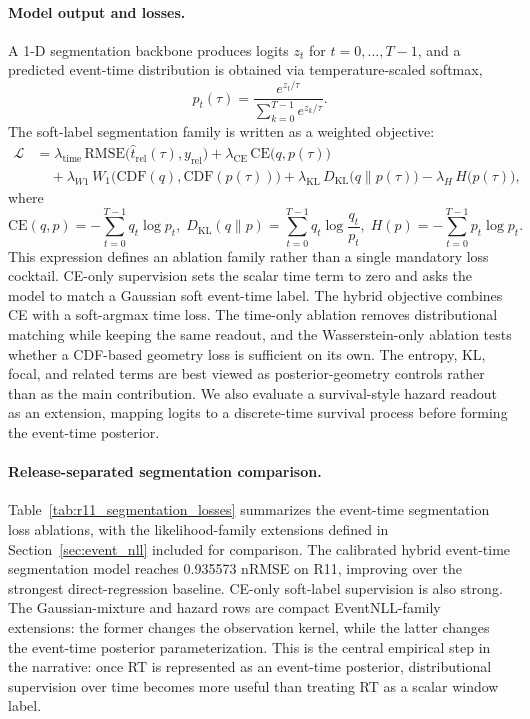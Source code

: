 \documentclass[12pt]{article}
\begin{document}
\paragraph{Model output and losses.}
A 1-D segmentation backbone produces logits $z_t$ for $t=0,\dots,T-1$, and a predicted
event-time distribution is obtained via temperature-scaled softmax,
\begin{equation}
\label{eq:rt_pred_dist}
p_t(\tau)=\frac{e^{z_t/\tau}}{\sum_{k=0}^{T-1} e^{z_k/\tau}}.
\end{equation}
The soft-label segmentation family is written as a weighted objective:
\begin{equation}
\label{eq:rt_loss}
\begin{aligned}
\mathcal{L}
&= \lambda_{\text{time}}\,\mathrm{RMSE}\big(\hat t_{\mathrm{rel}}(\tau), y_{\mathrm{rel}}\big)
 + \lambda_{\text{CE}}\,\mathrm{CE}\big(q, p(\tau)\big) \\
&\quad + \lambda_{W1}\,W_1\big(\mathrm{CDF}(q), \mathrm{CDF}(p(\tau))\big)
 + \lambda_{\text{KL}}\,D_{\mathrm{KL}}\big(q\|p(\tau)\big)
 - \lambda_{H}\,H\big(p(\tau)\big),
\end{aligned}
\end{equation}
where  
\begin{equation*}
\mathrm{CE}(q,p)=-\sum_{t=0}^{T-1} q_t \log p_t, \;
D_{\mathrm{KL}}(q\|p)=\sum_{t=0}^{T-1} q_t \log\frac{q_t}{p_t}, \;
H(p)=-\sum_{t=0}^{T-1} p_t \log p_t.
\end{equation*}
This expression defines an ablation family rather than a single mandatory loss cocktail. CE-only supervision sets the scalar time term to zero and asks the model to match a Gaussian soft event-time label. The hybrid objective combines CE with a soft-argmax time loss. The time-only ablation removes distributional matching while keeping the same readout, and the Wasserstein-only ablation tests whether a CDF-based geometry loss is sufficient on its own. The entropy, KL, focal, and related terms are best viewed as posterior-geometry controls rather than as the main contribution. We also evaluate a survival-style hazard readout as an extension, mapping logits to a discrete-time survival process before forming the event-time posterior.

\paragraph{Release-separated segmentation comparison.}
Table~\ref{tab:r11_segmentation_losses} summarizes the event-time segmentation loss ablations, with the likelihood-family extensions defined in Section~\ref{sec:event_nll} included for comparison. The calibrated hybrid event-time segmentation model reaches 0.935573 nRMSE on R11, improving over the strongest direct-regression baseline. CE-only soft-label supervision is also strong. The Gaussian-mixture and hazard rows are compact EventNLL-family extensions: the former changes the observation kernel, while the latter changes the event-time posterior parameterization. This is the central empirical step in the narrative: once RT is represented as an event-time posterior, distributional supervision over time becomes more useful than treating RT as a scalar window label.
\end{document}
